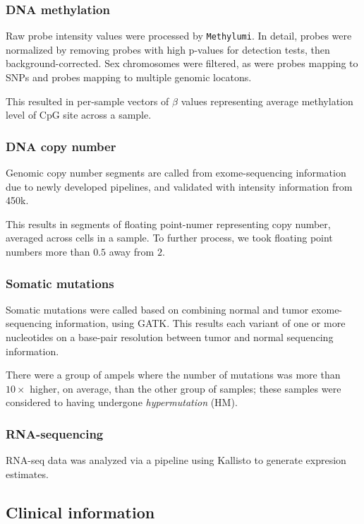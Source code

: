 \subsubsection{DNA methylation}
Raw probe intensity values were processed by
\texttt{Methylumi}\cite{davis_package_2013}. In detail, probes were
normalized by removing probes with high p-values for detection tests,
then background-corrected. Sex chromosomes were filtered, as were
probes mapping to SNPs and probes mapping to multiple genomic
locatons.

This resulted in per-sample vectors of $\beta$ values representing average methylation level
of CpG site across a sample.

\subsubsection{DNA copy number}

Genomic copy number segments are called from exome-sequencing
information due to newly developed pipelines, and validated with
intensity information from 450k.

This results in segments of floating point-numer representing copy
number, averaged across cells in a sample. To further process, we took
floating point numbers more than $0.5$ away from $2$.

\subsubsection{Somatic mutations}

Somatic mutations were called based on combining normal and tumor
exome-sequencing information, using GATK. This results
each variant of one or more nucleotides on a base-pair resolution
between tumor and normal sequencing information.

There were a group of ampels where the number of mutations was more than $10 \times$
higher, on average, than the other group of samples; these samples
were considered to having undergone \textit{hypermutation} (HM). 

\subsubsection{RNA-sequencing}

RNA-seq data was analyzed via a pipeline using
Kallisto\cite{bray_near-optimal_2016} to generate expresion
estimates. 

\subsection{Clinical information}

